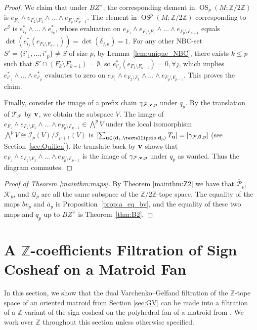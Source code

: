 \documentclass{amsart}
\newcommand\Fcal{{\mathcal F}}
\newcommand\Ical{{\mathcal I}}
\newcommand\Kcal{{\mathcal K}}
\newcommand\Qcal{{\mathcal Q}}
\newcommand\Pcal{{\mathcal P}}
\newcommand\Tcal{{\mathcal T}}
\newcommand\dd{{\bf d}}
\newcommand\uu{{\bf u}}
\newcommand\vv{{\bf v}}
\newcommand\ZZ{{\mathbb Z}}
\newcommand\Ztwo{{\mathbb Z}/2{\mathbb Z}}
\newcommand\qbv{{q}}
\DeclareMathOperator{\OS}{OS}
\begin{document}
{\begin{proof}
We claim that under $BZ^\vee$, the corresponding element in $\OS_p(\underline{M};\Ztwo)$ is $e_{F_1}\wedge e_{F_2\setminus F_1}\wedge\ldots\wedge e_{F_p\setminus F_{p-1}}$.
The element in $\OS^p(\underline{M};\Ztwo)$ corresponding to $c^S$ is $e^*_{i_1}\wedge\ldots\wedge e^*_{i_p}$, whose evaluation on $e_{F_1}\wedge e_{F_2\setminus F_1}\wedge\ldots\wedge e_{F_p\setminus F_{p-1}}$ equals $\det(e^*_{i_j}(e_{F_k\setminus F_{k-1}}))=\det(\delta_{j,k})=1$.
For any other NBC-set $S'=\{i'_1,\ldots,i'_p\}\neq S$ of size $p$, by Lemma~\ref{lem:unique_NBC}, there exists $k\leq p$ such that $S'\cap(F_k\setminus F_{k-1})=\emptyset$, so $e^*_{i'_j}(e_{F_k\setminus F_{k-1}})=0,\forall j$, which implies $e^*_{i'_1}\wedge\ldots\wedge e^*_{i'_p}$ evaluates to zero on $e_{F_1}\wedge e_{F_2\setminus F_1}\wedge\ldots\wedge e_{F_p\setminus F_{p-1}}$. This proves the claim. 

Finally, consider the image of a prefix chain $\gamma_{\Fcal,\vv,p}$ under $\qbv_p$. 
By the translation of $\Tcal_{\Fcal}$ by $\vv$, we obtain the subspace $V$.
The image of $e_{F_1}\wedge e_{F_2\setminus F_1}\wedge\ldots\wedge e_{F_p\setminus F_{p-1}}\in \bigwedge^p V$ under the local isomorphism $\bigwedge^p V\cong\Ical_p(V)/\Ical_{p+1}(V)$ is $[\sum_{\uu\in\langle \dd_1,\ldots,\dd_p\rangle} T_{\uu}]=[\gamma_{\Fcal,{\bf 0},p}]$ (see Section~\ref{sec:Quillen}).
Re-translate back by $\vv$ shows that $e_{F_1}\wedge e_{F_2\setminus F_1}\wedge\ldots\wedge e_{F_p\setminus F_{p-1}}$ is the image of $\gamma_{\Fcal,\vv,p}$ under $\qbv_p$ as wanted. Thus the diagram commutes. 
\end{proof}

\begin{proof}[Proof of Theorem \ref{mainthm:maps}]
By Theorem \ref{mainthm:Z2} we have that $\overline{\Pcal}_p$, $\Kcal_p$, and $\Qcal_p$ are all the same subspace of the $\Ztwo$-tope space.
The equality of the maps $bv_p$ and $\overline{a}_p$ is Proposition~\ref{prop:a_eq_bv}, and the equality of these two maps and $\qbv_p$ up to $BZ^\vee$ is Theorem~\ref{thm:B2}.
\end{proof}

\section{A $\ZZ$-coefficients Filtration of Sign Cosheaf on a Matroid Fan} \label{sec:cosheaf}

In this section, we show that the dual Varchenko--Gelfand filtration of the $\ZZ$-tope space of an oriented matroid from Section \ref{sec:GV} can be made into a filtration of a $\ZZ$-variant of the sign cosheaf on the polyhedral fan of a matroid from \cite{RRS2}. We work over $\ZZ$ throughout this section unless otherwise specified. 

}
\end{document}
